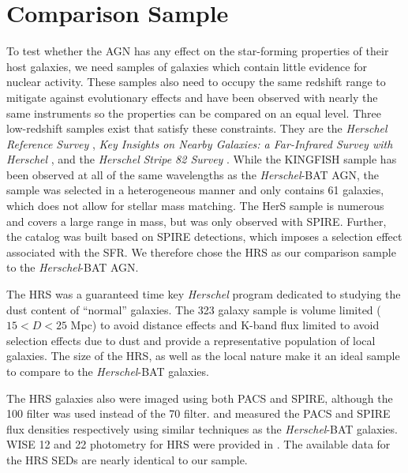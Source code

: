 \documentclass[fleqn, usenatbib]{mnras}
\newcommand{\herschel}{\emph{Herschel}}
\begin{document}
\section{Comparison Sample}
To test whether the AGN has any effect on the star-forming properties of their host galaxies, we need samples of galaxies which contain little evidence for nuclear activity. These samples also need to occupy the same redshift range to mitigate against evolutionary effects and have been observed with nearly the same instruments so the properties can be compared on an equal level. Three low-redshift samples exist that satisfy these constraints. They are the  \herschel{} \textit{Reference Survey} \cite[HRS;][]{Boselli:2010fj}, \textit{Key Insights on Nearby Galaxies: a Far-Infrared Survey with Herschel} \cite[KINGFISH;][]{Kennicutt:2011vn}, and the \herschel{} \textit{Stripe 82 Survey} \citep[HerS;][]{Viero:2014jk}. While the KINGFISH sample has been observed at all of the same wavelengths as the \herschel-BAT AGN, the sample was selected in a heterogeneous manner and only contains 61 galaxies, which does not allow for stellar mass matching. The HerS sample is numerous and covers a large range in mass, but was only observed with SPIRE. Further, the catalog was built based on SPIRE detections, which imposes a selection effect associated with the SFR. We therefore chose the HRS as our comparison sample to the \herschel-BAT AGN.

The HRS was a guaranteed time key \herschel{} program dedicated to studying the dust content of ``normal'' galaxies. The 323 galaxy sample is volume limited ($15< D < 25$ Mpc) to avoid distance effects and K-band flux limited to avoid selection effects due to dust and provide a representative population of local galaxies. The size of the HRS, as well as the local nature make it an ideal sample to compare to the \herschel-BAT galaxies.

The HRS galaxies also were imaged using both PACS and SPIRE, although the 100 \micron{} filter was used instead of the 70 \micron{} filter. \citet{Cortese:2014qq} and \citet{Ciesla:2012lq} measured the PACS and SPIRE flux densities respectively using similar techniques as the \herschel-BAT galaxies. WISE 12 and 22 \micron{} photometry for HRS were provided in \citet{Ciesla:2014qy}. The available data for the HRS SEDs are nearly identical to our sample. 
\end{document}
